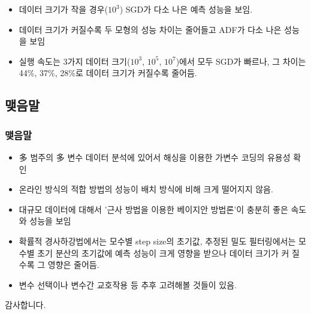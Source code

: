 \documentclass{beamer}
\begin{document}
\begin{frame}
{\begin{center}
\begin{tabular}{ccccccc}
	\hline %
	\end{tabular}
    \end{center}
}




{\footnotesize
\begin{itemize}
[circle]
\item 데이터 크기가 작을 경우($10^3$) SGD가 다소 나은 예측 성능을 보임.
\item 데이터 크기가 커질수록 두 모형의 성능 차이는 줄어들고 ADF가 다소 나은 성능을 보임
\item 실행 속도는 3가지 데이터 크기($10^3$, $10^5$, $10^7$)에서 모두 SGD가 빠르나, 그 차이는 44\%, 37\%, 28\%로 데이터 크기가 커질수록 줄어듬.
\end{itemize}
}




\end{frame}





\subsection{맺음말} %

\begin{frame}
\frametitle{맺음말}

{\footnotesize
\begin{itemize}

\item 多 범주의 多 변수 데이터 분석에 있어서 해싱을 이용한 가변수 코딩의 유용성 확인
\item 온라인 방식의 적합 방법의 성능이 배치 방식에 비해 크게 떨어지지 않음.
\item 대규모 데이터에 대해서 '근사 방법을 이용한 베이지안 방법론'이 충분히 좋은 속도와 성능을 보임
\item 확률적 경사하강법에서는 모수별 step size의 초기값, 추정된 밀도 필터링에서는 모수별 초기 분산의 초기값에 예측 성능이 크게 영향을 받으나 데이터 크기가 커 질수록 그 영향은 줄어듬.
\item 변수 선택이나 변수간 교호작용 등 추후 고려해볼 것들이 있음.

\end{itemize}
}


\end{frame}













\begin{frame}
\Huge{\centerline{감사합니다.}}
\end{frame}


%
%
\end{document}
